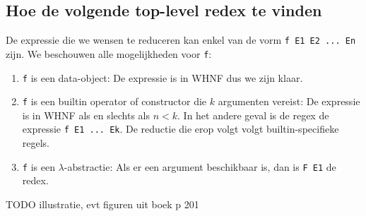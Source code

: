 \documentclass[a4paper,10pt]{article}
\begin{document}
\subsection{Hoe de volgende top-level redex te vinden}
De expressie die we wensen te reduceren kan enkel van de vorm \texttt{f E1 E2 ... En} zijn.
We beschouwen alle mogelijkheden voor \texttt{f}:
\begin{enumerate}
\item \texttt{f} is een data-object: De expressie is in WHNF dus we zijn klaar.
\item \texttt{f} is een builtin operator of constructor die $k$ argumenten vereist: De expressie is in WHNF als en slechts als $n < k$. In het andere geval is de regex de expressie \texttt{f E1 ... Ek}. De reductie die erop volgt volgt builtin-specifieke regels.
\item \texttt{f} is een $\lambda$-abstractie: Als er een argument beschikbaar is, dan is \texttt{F E1} de redex.
\end{enumerate}
TODO illustratie, evt figuren uit boek p 201
\paragraph{}
\end{document}
